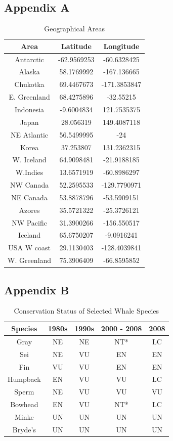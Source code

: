 \documentclass[12pt,a4paper]{article}
\begin{document}
\subsection{Appendix A}
\begin{table}[H]
\centering
\caption{Geographical Areas}
\begin{tabular}{|c|c|c|}
\hline
Area & Latitude & Longitude \\
\hline
Antarctic & -62.9569253 & -60.6328425 \\
\hline
Alaska & 58.1769992 & -167.136665 \\
\hline
Chukotka & 69.4467673 & -171.3853847 \\
\hline
E. Greenland & 68.4275896 & -32.55215 \\
\hline
Indonesia & -9.6004834 & 121.7535375 \\
\hline
Japan & 28.056319 & 149.4087118 \\
\hline
NE Atlantic & 56.5499995 & -24 \\
\hline
Korea & 37.253807 & 131.2362315 \\
\hline
W. Iceland & 64.9098481 & -21.9188185 \\
\hline
W.Indies & 13.6571919 & -60.8986297 \\
\hline
NW Canada & 52.2595533 & -129.7790971 \\
\hline
NE Canada & 53.8878796 & -53.5909151 \\
\hline
Azores & 35.5721322 & -25.3726121 \\
\hline
NW Pacific & 31.3900266 & -156.550517 \\
\hline
Iceland & 65.6750207 & -9.0916241 \\
\hline
USA W coast & 29.1130403 & -128.4039841 \\
\hline
W. Greenland & 75.3906409 & -66.8595852 \\
\hline
\end{tabular}
\label{tab:geographical_areas}
\end{table}

\subsection{Appendix B}
\begin{table}[h]
\centering
\caption{Conservation Status of Selected Whale Species}
\begin{tabular}{|c|c|c|c|c|}
\hline
Species & 1980s & 1990s & 2000 - 2008 & 2008 \\
\hline
Gray & NE & NE & NT* & LC \\
\hline
Sei & NE & VU & EN & EN \\
\hline
Fin & VU & VU & EN & EN \\
\hline
Humpback & EN & VU & VU & LC \\
\hline
Sperm & NE & VU & VU & VU \\
\hline
Bowhead & EN & VU & NT* & LC \\
\hline
Minke & UN & UN & UN & UN \\
\hline
Bryde’s & UN & UN & UN & UN \\
\hline
\end{tabular}
\label{tab:whale_species}
\end{table}
\end{document}
